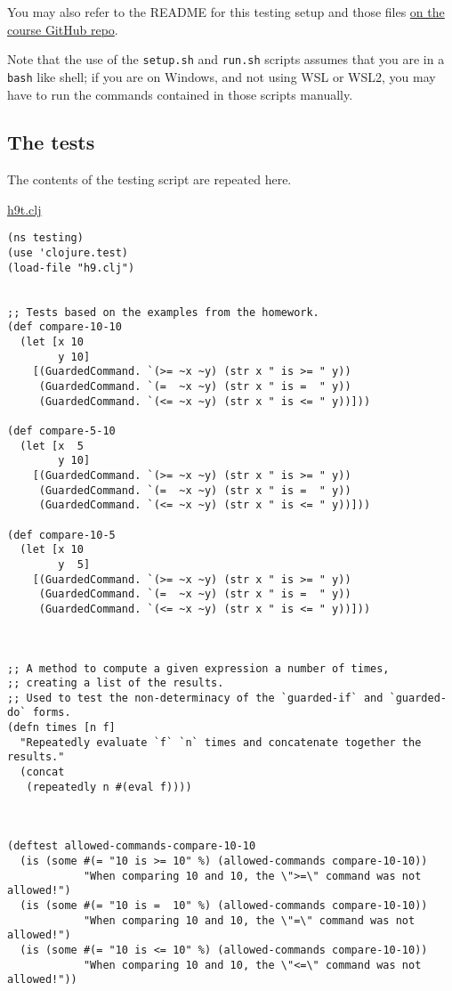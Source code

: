 \documentclass[11pt]{article}
\begin{document}
You may also refer to the README
for this testing setup and those files
\href{https://github.com/armkeh/principles-of-programming-languages/tree/master/homework/testing/h5}{on the course GitHub repo}.

Note that the use of the \texttt{setup.sh} and \texttt{run.sh} scripts assumes
that you are in a \texttt{bash} like shell; if you are on Windows,
and not using WSL or WSL2, you may have
to run the commands contained in those scripts manually.

\subsection*{The tests}
\label{sec:org5e61cdc}
The contents of the testing script are repeated here.

\href{./testing/h9/h9t.clj}{h9t.clj}
\begin{verbatim}
(ns testing)
(use 'clojure.test)
(load-file "h9.clj")


;; Tests based on the examples from the homework.
(def compare-10-10
  (let [x 10
        y 10]
    [(GuardedCommand. `(>= ~x ~y) (str x " is >= " y))
     (GuardedCommand. `(=  ~x ~y) (str x " is =  " y))
     (GuardedCommand. `(<= ~x ~y) (str x " is <= " y))]))

(def compare-5-10
  (let [x  5
        y 10]
    [(GuardedCommand. `(>= ~x ~y) (str x " is >= " y))
     (GuardedCommand. `(=  ~x ~y) (str x " is =  " y))
     (GuardedCommand. `(<= ~x ~y) (str x " is <= " y))]))

(def compare-10-5
  (let [x 10
        y  5]
    [(GuardedCommand. `(>= ~x ~y) (str x " is >= " y))
     (GuardedCommand. `(=  ~x ~y) (str x " is =  " y))
     (GuardedCommand. `(<= ~x ~y) (str x " is <= " y))]))



;; A method to compute a given expression a number of times,
;; creating a list of the results.
;; Used to test the non-determinacy of the `guarded-if` and `guarded-do` forms.
(defn times [n f]
  "Repeatedly evaluate `f` `n` times and concatenate together the results."
  (concat
   (repeatedly n #(eval f))))



(deftest allowed-commands-compare-10-10
  (is (some #(= "10 is >= 10" %) (allowed-commands compare-10-10))
            "When comparing 10 and 10, the \">=\" command was not allowed!")
  (is (some #(= "10 is =  10" %) (allowed-commands compare-10-10))
            "When comparing 10 and 10, the \"=\" command was not allowed!")
  (is (some #(= "10 is <= 10" %) (allowed-commands compare-10-10))
            "When comparing 10 and 10, the \"<=\" command was not allowed!"))


\end{verbatim}
\end{document}
